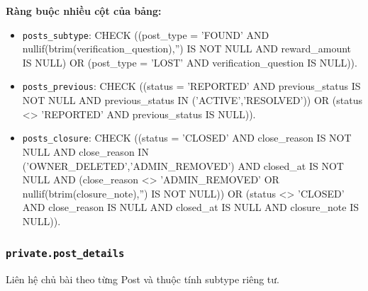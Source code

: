 \textbf{Ràng buộc nhiều cột của bảng:}

\begin{itemize}

\item \texttt{posts\_\allowbreak{}subtype}: CHECK ((post\_\allowbreak{}type = 'FOUND' AND nullif(btrim(verification\_\allowbreak{}question),\allowbreak{}'') IS NOT NULL AND reward\_\allowbreak{}amount IS NULL) OR (post\_\allowbreak{}type = 'LOST' AND verification\_\allowbreak{}question IS NULL)).

\item \texttt{posts\_\allowbreak{}previous}: CHECK ((status = 'REPORTED' AND previous\_\allowbreak{}status IS NOT NULL AND previous\_\allowbreak{}status IN ('ACTIVE',\allowbreak{}'RESOLVED')) OR (status <> 'REPORTED' AND previous\_\allowbreak{}status IS NULL)).

\item \texttt{posts\_\allowbreak{}closure}: CHECK ((status = 'CLOSED' AND close\_\allowbreak{}reason IS NOT NULL AND close\_\allowbreak{}reason IN ('OWNER\_\allowbreak{}DELETED',\allowbreak{}'ADMIN\_\allowbreak{}REMOVED') AND closed\_\allowbreak{}at IS NOT NULL AND (close\_\allowbreak{}reason <> 'ADMIN\_\allowbreak{}REMOVED' OR nullif(btrim(closure\_\allowbreak{}note),\allowbreak{}'') IS NOT NULL)) OR (status <> 'CLOSED' AND close\_\allowbreak{}reason IS NULL AND closed\_\allowbreak{}at IS NULL AND closure\_\allowbreak{}note IS NULL)).

\end{itemize}

\subsubsection*{\texttt{private.post\_\allowbreak{}details}}

Liên hệ chủ bài theo từng Post và thuộc tính subtype riêng tư.

